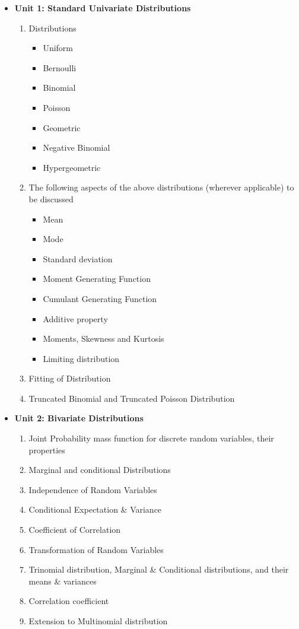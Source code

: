 \documentclass[
10pt, %
a4paper, %
]{report}
\begin{document}
\begin{itemize}
\item[] \textbf{Unit 1: Standard Univariate Distributions}
\begin{enumerate}
\item Distributions
\begin{itemize}
\item Uniform
\item Bernoulli
\item Binomial
\item Poisson
\item Geometric
\item Negative Binomial
\item Hypergeometric
\end{itemize}
\item The following aspects of the above distributions (wherever applicable) to be discussed
\begin{itemize}
\item Mean
\item Mode
\item Standard deviation
\item Moment Generating Function
\item Cumulant Generating Function
\item Additive property
\item Moments, Skewness and Kurtosis
\item Limiting distribution
\end{itemize}
\item Fitting of Distribution
\item Truncated Binomial and Truncated Poisson Distribution
\end{enumerate}
\item[] \textbf{Unit 2: Bivariate Distributions}
\begin{enumerate}
\item Joint Probability mass function for discrete random variables, their properties
\item Marginal and conditional Distributions
\item Independence of Random Variables
\item Conditional Expectation \& Variance
\item Coefficient of Correlation
\item Transformation of Random Variables
\item Trinomial distribution, Marginal \& Conditional distributions, and their means \& variances
\item Correlation coefficient
\item Extension to Multinomial distribution
\end{enumerate}
\end{itemize}
\end{document}
